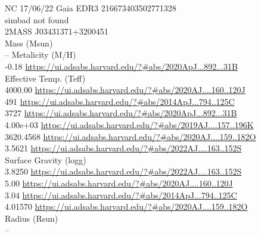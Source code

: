 NC 17/06/22
Gaia EDR3 216673403502771328\\
simbad not found \\

2MASS J03431371+3200451 \\
Mass (Msun)\\
--
Metalicity (M/H)\\
-0.18 \url{https://ui.adsabs.harvard.edu/?#abs/2020ApJ...892...31B}\\
Effective Temp. (Teff)\\
4000.00 \url{https://ui.adsabs.harvard.edu/?#abs/2020AJ....160..120J}\\
491 \url{https://ui.adsabs.harvard.edu/?#abs/2014ApJ...794..125C}\\
3727 \url{https://ui.adsabs.harvard.edu/?#abs/2020ApJ...892...31B}\\
4.00e+03 \url{https://ui.adsabs.harvard.edu/?#abs/2019AJ....157..196K}\\
3620.4568 \url{https://ui.adsabs.harvard.edu/?#abs/2020AJ....159..182O}\\
3.5621 \url{https://ui.adsabs.harvard.edu/?#abs/2022AJ....163..152S}\\
Surface Gravity (logg)\\
3.8250 \url{https://ui.adsabs.harvard.edu/?#abs/2022AJ....163..152S}\\
5.00 \url{https://ui.adsabs.harvard.edu/?#abs/2020AJ....160..120J}\\
3.04 \url{https://ui.adsabs.harvard.edu/?#abs/2014ApJ...794..125C}\\
4.01570 \url{https://ui.adsabs.harvard.edu/?#abs/2020AJ....159..182O}\\
Radius (Rsun)\\
--\\